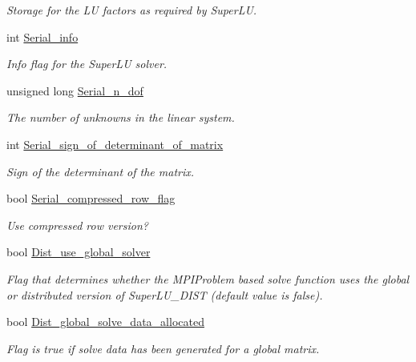 \begin{DoxyCompactItemize}
\begin{DoxyCompactList}\small\item\em Storage for the LU factors as required by Super\+LU. \end{DoxyCompactList}\item 
int \hyperlink{classoomph_1_1SuperLUSolver_afb45da60b3bb2e75db5bd7d83b488064}{Serial\+\_\+info}
\begin{DoxyCompactList}\small\item\em Info flag for the Super\+LU solver. \end{DoxyCompactList}\item 
unsigned long \hyperlink{classoomph_1_1SuperLUSolver_a7c18b341d34df78809d8c5c3332d675d}{Serial\+\_\+n\+\_\+dof}
\begin{DoxyCompactList}\small\item\em The number of unknowns in the linear system. \end{DoxyCompactList}\item 
int \hyperlink{classoomph_1_1SuperLUSolver_aa9c97e960b45b82eb01dd5548bed89a1}{Serial\+\_\+sign\+\_\+of\+\_\+determinant\+\_\+of\+\_\+matrix}
\begin{DoxyCompactList}\small\item\em Sign of the determinant of the matrix. \end{DoxyCompactList}\item 
bool \hyperlink{classoomph_1_1SuperLUSolver_a50f46a4d8c674f3853ce0f682ebd4096}{Serial\+\_\+compressed\+\_\+row\+\_\+flag}
\begin{DoxyCompactList}\small\item\em Use compressed row version? \end{DoxyCompactList}\item 
bool \hyperlink{classoomph_1_1SuperLUSolver_aab7193cb7f228dc57c4e6c237ea065ba}{Dist\+\_\+use\+\_\+global\+\_\+solver}
\begin{DoxyCompactList}\small\item\em Flag that determines whether the M\+P\+I\+Problem based solve function uses the global or distributed version of Super\+L\+U\+\_\+\+D\+I\+ST (default value is false). \end{DoxyCompactList}\item 
bool \hyperlink{classoomph_1_1SuperLUSolver_ac5458172732cfe687891af65cc2d45e6}{Dist\+\_\+global\+\_\+solve\+\_\+data\+\_\+allocated}
\begin{DoxyCompactList}\small\item\em Flag is true if solve data has been generated for a global matrix. \end{DoxyCompactList}\item 

\end{DoxyCompactItemize}
